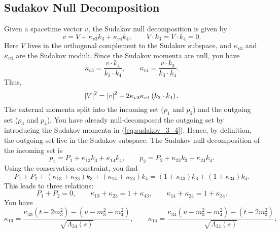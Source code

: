 \subsection{Sudakov Null Decomposition}
Given a spacetime vector $v$, the Sudakov null decomposition is given by
\begin{equation}
	v = V + \kappa_{v3} k_{3} + \kappa_{v4} k_{4}, \qquad V \cdot k_{3} = V \cdot k_{4} = 0.
\end{equation}
Here $V$ lives in the orthogonal complement to the Sudakov subspace, and $\kappa_{v3}$ and $\kappa_{v4}$ are the Sudakov moduli. Since the Sudakov momenta are null, you have
\begin{equation}
	\kappa_{v3} = \frac{v \cdot k_{4}}{k_{3} \cdot k_{4}}, \qquad \kappa_{v4} = \frac{v \cdot k_{3}}{k_{3} \cdot k_{4}}.
\end{equation}
Thus,
\begin{equation}
	\left\lvert V \right\rvert^{2} = \left\lvert v \right\rvert^{2} - 2 \kappa_{v3} \kappa_{v4} \left( k_{3} \cdot k_{4} \right).
\end{equation}
The external momenta split into the incoming set ($p_{1}$ and $p_{2}$) and the outgoing set ($p_{3}$ and $p_{4}$). You have already null-decomposed the outgoing set by introducing the Sudakov momenta in (\ref{eq:sudakov_3_4}). Hence, by definition, the outgoing set live in the Sudakov subspace. The Sudakov null decomposition of the incoming set is
\begin{equation}
	p_{1} = P_{1} + \kappa_{13} k_{3} + \kappa_{14} k_{4}, \qquad p_{2} = P_{2} + \kappa_{23} k_{3} + \kappa_{24} k_{4}.
\end{equation}
Using the conservation constraint, you find
\begin{equation}
	P_{1} + P_{2} + \left( \kappa_{13} + \kappa_{23} \right) k_{3} + \left( \kappa_{14} + \kappa_{24} \right) k_{4} = \left( 1 + \kappa_{43} \right) k_{3} + \left( 1 + \kappa_{34} \right) k_{4}.
\end{equation}
This leads to three relations:
\begin{equation}
	P_{1} + P_{2} = 0, \qquad \kappa_{13} + \kappa_{23} = 1 + \kappa_{43}, \qquad \kappa_{14} + \kappa_{24} = 1 + \kappa_{34}.
	\label{eq:conv_rel}
\end{equation}
You have
\begin{equation}
	\kappa_{13} = \frac{\kappa_{43} \left( t - 2 m_{3}^{2} \right) - \left( u - m_{3}^{2} - m_{4}^{2} \right) }{\sqrt{\Lambda_{34}(s)}}, \qquad
	\kappa_{14} = \frac{\kappa_{34} \left( u - m_{3}^{2} - m_{4}^{2} \right) - \left( t - 2 m_{3}^{2} \right) }{\sqrt{\Lambda_{34}(s)}};
\end{equation}
